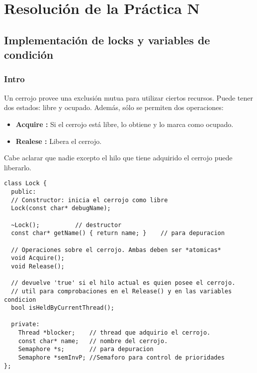 \chapter{Resolución de la Práctica N}
\section{Implementación de locks y variables de condición}
\subsection*{Intro}
Un cerrojo provee una exclusión mutua para utilizar ciertos recursos. Puede tener dos estados: libre y ocupado. Además, sólo se permiten dos operaciones:
\begin{itemize}
	\item \textbf{Acquire :} Si el cerrojo está libre, lo obtiene y lo marca como ocupado.
	\item \textbf{Realese :} Libera el cerrojo.
\end{itemize}
Cabe aclarar que nadie excepto el hilo que tiene adquirido el cerrojo puede liberarlo.\\

\begin{lstlisting}[style=C]
class Lock {
  public:
  // Constructor: inicia el cerrojo como libre
  Lock(const char* debugName);

  ~Lock();          // destructor
  const char* getName() { return name; }	// para depuracion

  // Operaciones sobre el cerrojo. Ambas deben ser *atomicas*
  void Acquire(); 
  void Release();

  // devuelve 'true' si el hilo actual es quien posee el cerrojo.
  // util para comprobaciones en el Release() y en las variables condicion
  bool isHeldByCurrentThread();	

  private:
    Thread *blocker; 	// thread que adquirio el cerrojo.
    const char* name;	// nombre del cerrojo.
    Semaphore *s;		// para depuracion
	Semaphore *semInvP; //Semaforo para control de prioridades
};
\end{lstlisting}

